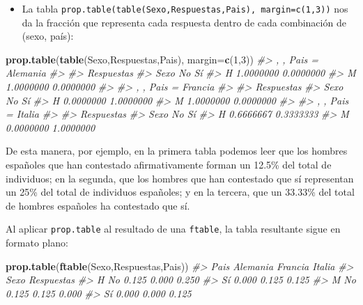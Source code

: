 \documentclass[
]{book}
\newenvironment{Shaded}{\begin{snugshade}}{\end{snugshade}}
\newcommand{\CommentTok}[1]{\textcolor[rgb]{0.56,0.35,0.01}{\textit{#1}}}
\newcommand{\DataTypeTok}[1]{\textcolor[rgb]{0.13,0.29,0.53}{#1}}
\newcommand{\DecValTok}[1]{\textcolor[rgb]{0.00,0.00,0.81}{#1}}
\newcommand{\KeywordTok}[1]{\textcolor[rgb]{0.13,0.29,0.53}{\textbf{#1}}}
\newcommand{\NormalTok}[1]{#1}
\providecommand{\tightlist}{%
  \setlength{\itemsep}{0pt}\setlength{\parskip}{0pt}}
\theoremstyle{definition}
\theoremstyle{definition}
\theoremstyle{definition}
\theoremstyle{remark}
\begin{document}
\begin{itemize}
\tightlist
\item
  La tabla \texttt{prop.table(table(Sexo,Respuestas,Pais),\ margin=c(1,3))} nos da la fracción que representa cada respuesta dentro de cada combinación de (sexo, país):
\end{itemize}

\begin{Shaded}
\begin{Highlighting}[]
\KeywordTok{prop.table}\NormalTok{(}\KeywordTok{table}\NormalTok{(Sexo,Respuestas,Pais), }\DataTypeTok{margin=}\KeywordTok{c}\NormalTok{(}\DecValTok{1}\NormalTok{,}\DecValTok{3}\NormalTok{))}
\CommentTok{\#\textgreater{} , , Pais = Alemania}
\CommentTok{\#\textgreater{} }
\CommentTok{\#\textgreater{}     Respuestas}
\CommentTok{\#\textgreater{} Sexo        No        Sí}
\CommentTok{\#\textgreater{}    H 1.0000000 0.0000000}
\CommentTok{\#\textgreater{}    M 1.0000000 0.0000000}
\CommentTok{\#\textgreater{} }
\CommentTok{\#\textgreater{} , , Pais = Francia}
\CommentTok{\#\textgreater{} }
\CommentTok{\#\textgreater{}     Respuestas}
\CommentTok{\#\textgreater{} Sexo        No        Sí}
\CommentTok{\#\textgreater{}    H 0.0000000 1.0000000}
\CommentTok{\#\textgreater{}    M 1.0000000 0.0000000}
\CommentTok{\#\textgreater{} }
\CommentTok{\#\textgreater{} , , Pais = Italia}
\CommentTok{\#\textgreater{} }
\CommentTok{\#\textgreater{}     Respuestas}
\CommentTok{\#\textgreater{} Sexo        No        Sí}
\CommentTok{\#\textgreater{}    H 0.6666667 0.3333333}
\CommentTok{\#\textgreater{}    M 0.0000000 1.0000000}
\end{Highlighting}
\end{Shaded}

De esta manera, por ejemplo, en la primera tabla podemos leer que los hombres españoles que han contestado afirmativamente forman un
12.5\% del total de individuos; en la segunda, que los hombres que han contestado que sí representan un 25\% del total de individuos españoles; y en la tercera, que un 33.33\% del total de hombres españoles ha contestado que sí.

Al aplicar \texttt{prop.table} al resultado de una \texttt{ftable}, la tabla resultante sigue en formato plano:

\begin{Shaded}
\begin{Highlighting}[]
\KeywordTok{prop.table}\NormalTok{(}\KeywordTok{ftable}\NormalTok{(Sexo,Respuestas,Pais)) }
\CommentTok{\#\textgreater{}                 Pais Alemania Francia Italia}
\CommentTok{\#\textgreater{} Sexo Respuestas                             }
\CommentTok{\#\textgreater{} H    No                 0.125   0.000  0.250}
\CommentTok{\#\textgreater{}      Sí                 0.000   0.125  0.125}
\CommentTok{\#\textgreater{} M    No                 0.125   0.125  0.000}
\CommentTok{\#\textgreater{}      Sí                 0.000   0.000  0.125}
\end{Highlighting}
\end{Shaded}
\end{document}
